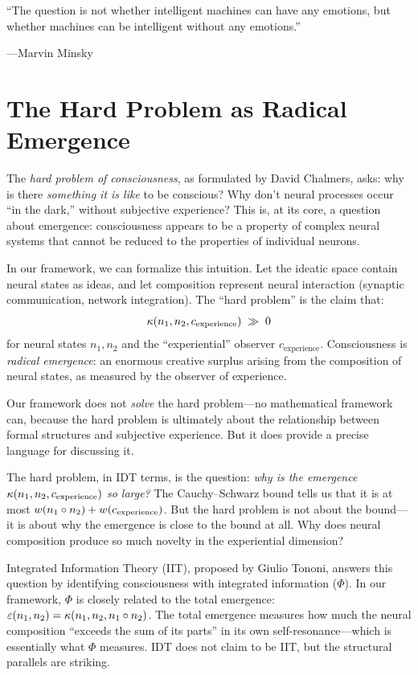 \epigraph{``The question is not whether intelligent machines can have any emotions,
but whether machines can be intelligent without any emotions.''}
{---Marvin Minsky}


\section{The Hard Problem as Radical Emergence}

The \emph{hard problem of consciousness}, as formulated by David Chalmers, asks:
why is there \emph{something it is like} to be conscious? Why don't neural processes
occur ``in the dark,'' without subjective experience? This is, at its core, a
question about emergence: consciousness appears to be a property of complex
neural systems that cannot be reduced to the properties of individual neurons.

In our framework, we can formalize this intuition. Let the ideatic space contain
neural states as ideas, and let composition represent neural interaction (synaptic
communication, network integration). The ``hard problem'' is the claim that:
\[
  \kappa(n_1, n_2, c_{\text{experience}}) \;\gg\; 0
\]
for neural states $n_1, n_2$ and the ``experiential'' observer $c_{\text{experience}}$.
Consciousness is \emph{radical emergence}: an enormous creative surplus arising
from the composition of neural states, as measured by the observer of experience.

\begin{interpretation}
Our framework does not \emph{solve} the hard problem---no mathematical framework
can, because the hard problem is ultimately about the relationship between
formal structures and subjective experience. But it does provide a precise
language for discussing it.

The hard problem, in IDT terms, is the question: \emph{why is the emergence
$\kappa(n_1, n_2, c_{\text{experience}})$ so large?} The Cauchy--Schwarz bound
tells us that it is at most $w(n_1 \circ n_2) + w(c_{\text{experience}})$.
But the hard problem is not about the bound---it is about why the emergence is
close to the bound at all. Why does neural composition produce so much novelty
in the experiential dimension?

Integrated Information Theory (IIT), proposed by Giulio Tononi, answers this
question by identifying consciousness with integrated information ($\Phi$). In
our framework, $\Phi$ is closely related to the total emergence:
$\varepsilon(n_1, n_2) = \kappa(n_1, n_2, n_1 \circ n_2)$. The total emergence
measures how much the neural composition ``exceeds the sum of its parts'' in
its own self-resonance---which is essentially what $\Phi$ measures. IDT does
not claim to be IIT, but the structural parallels are striking.
\end{interpretation}


